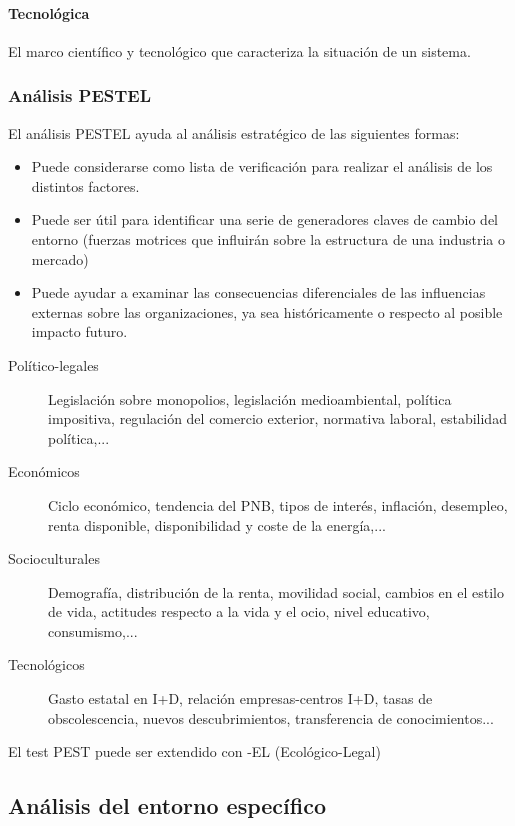 \documentclass[12pt]{article}
\theoremstyle{definition_wo_parentheses}
\begin{document}
\paragraph{Tecnológica} El marco científico y tecnológico que caracteriza la situación de un sistema.

\subsubsection{Análisis PESTEL}

El análisis PESTEL ayuda al análisis estratégico de las siguientes formas:

\begin{itemize}
\item Puede considerarse como lista de verificación para realizar el análisis de los distintos factores.
\item Puede ser útil para identificar una serie de generadores claves de cambio del entorno (fuerzas motrices que influirán sobre la estructura de una industria o mercado)
\item Puede ayudar a examinar las consecuencias diferenciales de las influencias externas sobre las organizaciones, ya sea históricamente o respecto al posible impacto futuro.
\end{itemize}

\begin{description}
\item[Político-legales] Legislación sobre monopolios, legislación medioambiental, política impositiva, regulación del comercio exterior, normativa laboral, estabilidad política,...
\item[Económicos] Ciclo económico, tendencia del PNB, tipos de interés, inflación, desempleo, renta disponible, disponibilidad y coste de la energía,...
\item[Socioculturales] Demografía, distribución de la renta, movilidad social, cambios en el estilo de vida, actitudes respecto a la vida y el ocio, nivel educativo, consumismo,...
\item[Tecnológicos] Gasto estatal en I+D, relación empresas-centros I+D, tasas de obscolescencia, nuevos descubrimientos, transferencia de conocimientos...
\end{description}

El test PEST puede ser extendido con -EL (Ecológico-Legal)

\subsection{Análisis del entorno específico}
\end{document}
